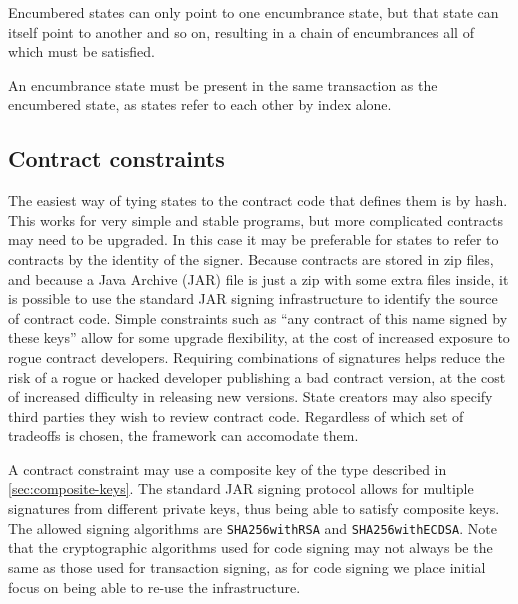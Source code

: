 \documentclass{article}
\begin{document}
Encumbered states can only point to one encumbrance state, but that state can itself point to another and so on,
resulting in a chain of encumbrances all of which must be satisfied.


An encumbrance state must be present in the same transaction as the encumbered state, as states refer to each other
by index alone.


\subsection{Contract constraints}\label{sec:contract-constraints}

The easiest way of tying states to the contract code that defines them is by hash. This works for very simple
and stable programs, but more complicated contracts may need to be upgraded. In this case it may be preferable
for states to refer to contracts by the identity of the signer. Because contracts are stored in zip files, and
because a Java Archive (JAR) file is just a zip with some extra files inside, it is possible to use the standard
JAR signing infrastructure to identify the source of contract code. Simple constraints such as ``any contract of
this name signed by these keys'' allow for some upgrade flexibility, at the cost of increased exposure to rogue
contract developers. Requiring combinations of signatures helps reduce the risk of a rogue or hacked developer
publishing a bad contract version, at the cost of increased difficulty in releasing new versions. State creators
may also specify third parties they wish to review contract code. Regardless of which set of tradeoffs is chosen,
the framework can accomodate them.

A contract constraint may use a composite key of the type described in \cref{sec:composite-keys}. The standard JAR
signing protocol allows for multiple signatures from different private keys, thus being able to satisfy composite
keys. The allowed signing algorithms are \texttt{SHA256withRSA} and \texttt{SHA256withECDSA}. Note that the
cryptographic algorithms used for code signing may not always be the same as those used for transaction signing,
as for code signing we place initial focus on being able to re-use the infrastructure.

\end{document}
